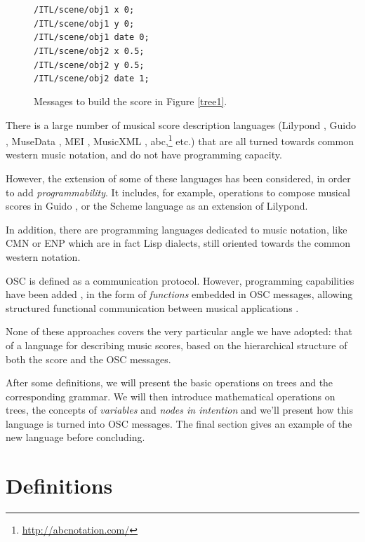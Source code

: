 \documentclass{article}
\newcommand{\code}	[2][0.9]		{\vspace{0mm}\begin{center}\colorbox{mygrey}{
							\begin{minipage}[t]{#1\columnwidth} 
							{\small \texttt{#2}}
							\end{minipage}}\end{center}}
\begin{document}
\begin{figure}[htbp]
\code{/ITL/scene/obj1 x 0;\\
/ITL/scene/obj1 y    0;\\
/ITL/scene/obj1 date 0;\\
/ITL/scene/obj2 x    0.5;\\
/ITL/scene/obj2 y    0.5;\\
/ITL/scene/obj2 date 1;
}
\caption{Messages to build the score in Figure \ref{tree1}.}
\label{script1}
\end{figure}


There is a large number of musical score description languages (Lilypond \cite{lilypond03}, Guido \cite{hoos98}, MuseData \cite{Hewlett97}, MEI \cite{Roland_2002}, MusicXML \cite{good01}, abc,\footnote{\url{http://abcnotation.com/}} etc.) that are all turned towards common western music notation, and do not have programming capacity. 

However, the extension of some of these languages has been considered, in order to add \textit{programmability}. It includes, for example, operations to compose musical scores in Guido \cite{fober12b}, or the Scheme language as an extension of Lilypond.

In addition, there are programming languages dedicated to music notation, like CMN \cite{Schottstaedt97} or ENP 
\cite{KUUSK06} which are in fact Lisp dialects, still oriented towards the common western notation.

OSC is defined as a communication protocol. However, programming capabilities have been added \cite{429}, in the form of \emph{functions} embedded in OSC messages, allowing structured functional communication between musical applications \cite{bresson:hal-01353794}. 

None of these approaches covers the very particular angle we have adopted: that of a language for describing music scores, based on the hierarchical structure of both the score and the OSC messages.

After some definitions, we will present the basic operations on trees and the corresponding grammar. We will then introduce mathematical operations on trees, the concepts of \emph{variables} and \emph{nodes in intention} and we'll present how this language is turned into OSC messages. The final section gives an example of the new language before concluding.


\section{Definitions}
\end{document}
